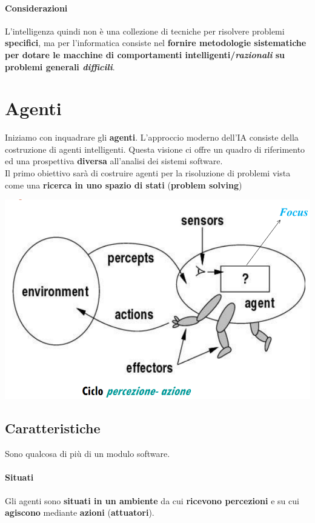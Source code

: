 \documentclass[10pt]{book}
\begin{document}
\paragraph{Considerazioni} L'intelligenza quindi non è una collezione di tecniche per risolvere problemi \textbf{specifici}, ma per l'informatica consiste nel \textbf{fornire metodologie sistematiche per dotare le macchine di comportamenti intelligenti/\textit{razionali} su problemi generali \textit{difficili}}.
\section{Agenti}
Iniziamo con inquadrare gli \textbf{agenti}. L'approccio moderno dell'IA consiste della costruzione di agenti intelligenti. Questa visione ci offre un quadro di riferimento ed una prospettiva \textbf{diversa} all'analisi dei sistemi software.\\
Il primo obiettivo sarà di costruire agenti per la risoluzione di problemi vista come una \textbf{ricerca in uno spazio di stati} (\textbf{problem solving})
\begin{center}
	\includegraphics[scale=0.7]{agenti.png}
\end{center}
\subsection{Caratteristiche}
Sono qualcosa di più di un modulo software.
\paragraph{Situati} Gli agenti sono \textbf{situati in un ambiente} da cui \textbf{ricevono percezioni} e su cui \textbf{agiscono} mediante \textbf{azioni} (\textbf{attuatori}).
\end{document}
